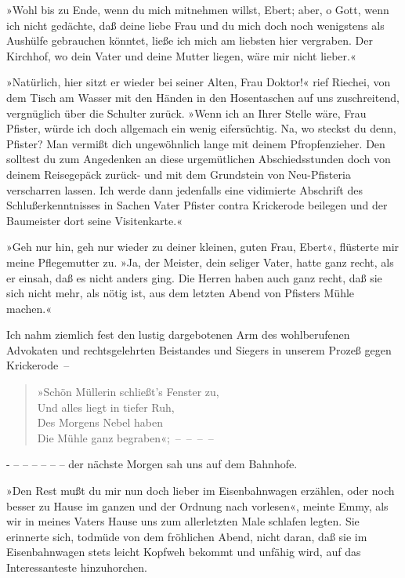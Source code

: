»Wohl bis zu Ende, wenn du mich mitnehmen willst, Ebert; aber, o
Gott, wenn ich nicht gedächte, daß deine liebe Frau und du mich
doch noch wenigstens als Aushülfe gebrauchen könntet, ließe ich
mich am liebsten hier vergraben. Der Kirchhof, wo dein Vater und
deine Mutter liegen, wäre mir nicht lieber.«

»Natürlich, hier sitzt er wieder bei seiner Alten, Frau Doktor!«
rief Riechei, von dem Tisch am Wasser mit den Händen in den
Hosentaschen auf uns zuschreitend, vergnüglich über die Schulter
zurück. »Wenn ich an Ihrer Stelle wäre, Frau Pfister, würde ich
doch allgemach ein wenig eifersüchtig. Na, wo steckst du denn,
Pfister? Man vermißt dich ungewöhnlich lange mit deinem
Pfropfenzieher. Den solltest du zum Angedenken an diese
urgemütlichen Abschiedsstunden doch von deinem Reisegepäck zurück-
und mit dem Grundstein von Neu-Pfisteria verscharren lassen. Ich
werde dann jedenfalls eine vidimierte Abschrift des
Schlußerkenntnisses in Sachen Vater Pfister contra Krickerode
beilegen und der Baumeister dort seine Visitenkarte.«

»Geh nur hin, geh nur wieder zu deiner kleinen, guten Frau, Ebert«,
flüsterte mir meine Pflegemutter zu. »Ja, der Meister, dein seliger
Vater, hatte ganz recht, als er einsah, daß es nicht anders ging.
Die Herren haben auch ganz recht, daß sie sich nicht mehr, als
nötig ist, aus dem letzten Abend von Pfisters Mühle machen.«

Ich nahm ziemlich fest den lustig dargebotenen Arm des
wohlberufenen Advokaten und rechtsgelehrten Beistandes und Siegers
in unserem Prozeß gegen Krickerode~–

\begin{verse}
»Schön Müllerin schließt's Fenster zu,\\
Und alles liegt in tiefer Ruh,\\
Des Morgens Nebel haben\\
Die Mühle ganz begraben«;~–~–~–~–
\end{verse}

- – – – – – – der nächste Morgen sah uns auf dem Bahnhofe.

»Den Rest mußt du mir nun doch lieber im Eisenbahnwagen erzählen,
oder noch besser zu Hause im ganzen und der Ordnung nach vorlesen«,
meinte Emmy, als wir in meines Vaters Hause uns zum allerletzten
Male schlafen legten. Sie erinnerte sich, todmüde von dem
fröhlichen Abend, nicht daran, daß sie im Eisenbahnwagen stets
leicht Kopfweh bekommt und unfähig wird, auf das Interessanteste
hinzuhorchen.

